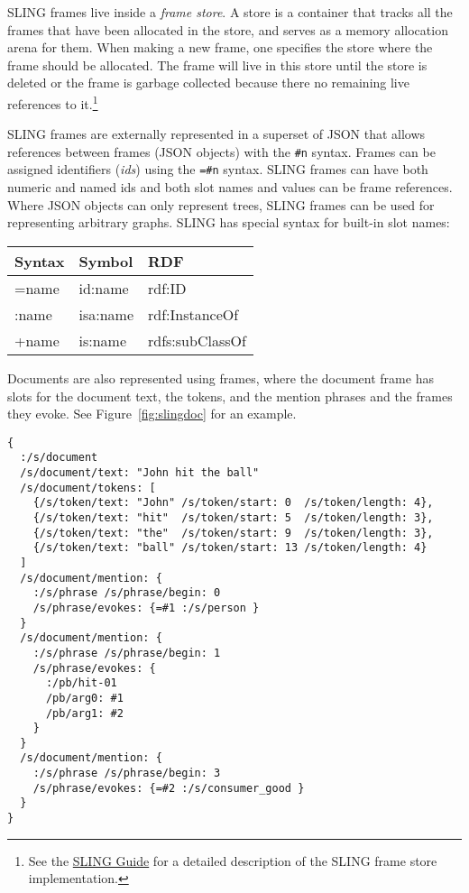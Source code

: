 \documentclass[11pt,a4paper]{article}
\begin{document}
SLING frames live inside a \emph{frame store}. A store is a container that
tracks all the frames that have been allocated in the store, and serves as a
memory allocation arena for them. When making a new frame, one
specifies the store where the frame should be allocated. The frame will live in
this store until the store is deleted or the frame is garbage collected because
there no remaining live references to it.\footnote{See the \href{https://github.com/google/sling/blob/master/frame/README.md}{SLING Guide}
for a detailed description of the SLING frame store implementation.}

SLING frames are externally represented in a superset of JSON that allows references
between frames (JSON objects) with the {\tt \#n} syntax. Frames can be
assigned identifiers (\emph{ids}) using the {\tt=\#n} syntax. SLING frames can have both numeric and
named ids and both slot names and values can be frame references. Where JSON
objects can only represent trees, SLING frames can be used for representing
arbitrary graphs. SLING has special syntax for built-in slot names:

\begin{table}[h!]
\begin{tabular}{|l|l|l|}
\hline
Syntax & Symbol & RDF \\
\hline
=name & id:name & rdf:ID \\
:name & isa:name & rdf:InstanceOf \\
+name & is:name & rdfs:subClassOf \\
\hline
\end{tabular}
\end{table}

Documents are also represented using frames, where the document frame has slots
for the document text, the tokens, and the mention phrases and the frames they
evoke. See Figure~\ref{fig:slingdoc} for an example.

\begin{figure*}[t]
  \begin{verbatim}
{
  :/s/document
  /s/document/text: "John hit the ball"
  /s/document/tokens: [
    {/s/token/text: "John" /s/token/start: 0  /s/token/length: 4},
    {/s/token/text: "hit"  /s/token/start: 5  /s/token/length: 3},
    {/s/token/text: "the"  /s/token/start: 9  /s/token/length: 3},
    {/s/token/text: "ball" /s/token/start: 13 /s/token/length: 4}
  ]
  /s/document/mention: {
    :/s/phrase /s/phrase/begin: 0
    /s/phrase/evokes: {=#1 :/s/person }
  }
  /s/document/mention: {
    :/s/phrase /s/phrase/begin: 1
    /s/phrase/evokes: {
      :/pb/hit-01
      /pb/arg0: #1
      /pb/arg1: #2
    }
  }
  /s/document/mention: {
    :/s/phrase /s/phrase/begin: 3
    /s/phrase/evokes: {=#2 :/s/consumer_good }
  }
}
\end{verbatim}
  \caption{The text ``John hit the ball" in SLING frame notation. The document
  itself is represented by a frame that has the text, an array of tokens and
  the mentions that evoke frames. There are three frames: a person frame (John),
  a consumer good frame (bat) and a hit-01 frame. The hit frame has the person
  frame as the agent (arg0) and the ball frame as the object (arg1).}
  \label{fig:slingdoc}
\end{figure*}
\end{document}
